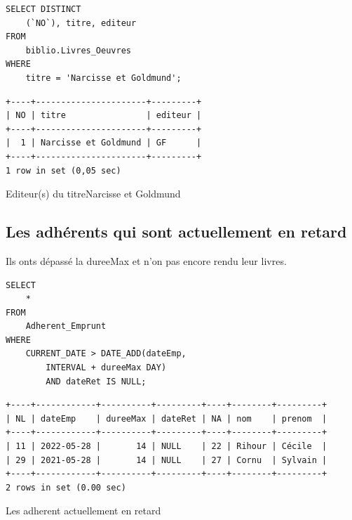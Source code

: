 \documentclass{article}
\begin{document}
\begin{center}
\begin{minipage}{0.5\linewidth}
\begin{listing}[H]
\begin{verbatim}
SELECT DISTINCT
    (`NO`), titre, editeur
FROM
    biblio.Livres_Oeuvres
WHERE
    titre = 'Narcisse et Goldmund';
\end{verbatim}
\begin{verbatim}
+----+----------------------+---------+
| NO | titre                | editeur |
+----+----------------------+---------+
|  1 | Narcisse et Goldmund | GF      |
+----+----------------------+---------+
1 row in set (0,05 sec)
\end{verbatim}
\caption{Editeur(s) du  titreNarcisse et Goldmund}
\end{listing}
\end{minipage}
\end{center}


\newpage
\subsection{Les adhérents qui sont  actuellement en retard}
Ils onts dépassé la dureeMax et n'on pas encore rendu leur livres.

\begin{center}
\begin{minipage}{0.75\linewidth}
\begin{listing}[H]
\begin{verbatim}
SELECT 
    *
FROM
    Adherent_Emprunt
WHERE
    CURRENT_DATE > DATE_ADD(dateEmp,
        INTERVAL + dureeMax DAY)
        AND dateRet IS NULL;
\end{verbatim}
\begin{verbatim}
+----+------------+----------+---------+----+--------+---------+
| NL | dateEmp    | dureeMax | dateRet | NA | nom    | prenom  |
+----+------------+----------+---------+----+--------+---------+
| 11 | 2022-05-28 |       14 | NULL    | 22 | Rihour | Cécile  |
| 29 | 2021-05-28 |       14 | NULL    | 27 | Cornu  | Sylvain |
+----+------------+----------+---------+----+--------+---------+
2 rows in set (0.00 sec)
\end{verbatim}
\caption{Les adherent actuellement en retard}
\end{listing}
\end{minipage}
\end{center}
\end{document}
